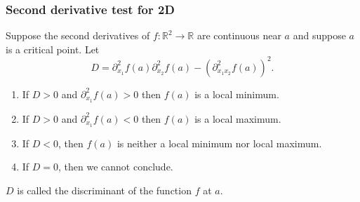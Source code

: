 \documentclass[aspectratio=169]{beamer}
\newcommand{\R}{\mathbb{R}}
\begin{document}
\begin{frame}
    \frametitle{Second derivative test for 2D}
    Suppose the second derivatives of $f:\R^2 \to \R$ are continuous near $a$ and
    suppose $a$ is a critical point. Let
    $$ D = \partial_{x_1}^2 f(a)\partial_{x_2}^2 f(a) - (\partial_{x_1 x_2}^2 f (a))^2. $$
    \begin{enumerate}
        \item If $D>0$ and $\partial_{x_1}^2 f(a) > 0$ then $f(a)$ is a local minimum.
        \item If $D>0$ and $\partial_{x_1}^2 f(a) < 0$ then $f(a)$ is a local maximum.
        \item If $D<0$, then $f(a)$ is neither a local minimum nor local maximum.
        \item If $D = 0$, then we cannot conclude.
    \end{enumerate}
    $D$ is called the discriminant of the function $f$ at $a$.
\end{frame}
\end{document}
